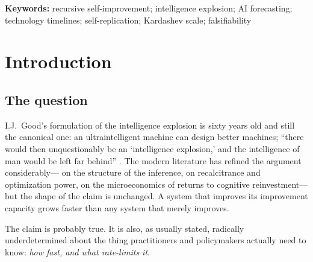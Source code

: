 \documentclass[11pt]{article}
\begin{document}
\begin{abstract}
Together these give the trajectory its characteristic shape: rapid apparent acceleration through the software loop, followed by a \emph{matter bottleneck} at the software/physical interface where growth is regulated not by cognition but by the slowest physical process on the critical path.

We present four-scenario timeline ranges rather than point estimates, give explicit falsification conditions for each structural claim, and identify a hazard in self-revising frameworks generally: a theory licensed to update its parameters on disconfirmation is unfalsifiable unless its revision rules are fixed in advance. We propose a pre-registration protocol as the remedy.
\end{abstract}

\vspace{0.5em}
\noindent\textbf{Keywords:} recursive self-improvement; intelligence explosion; AI forecasting; technology timelines; self-replication; Kardashev scale; falsifiability

\tableofcontents
\newpage

\section{Introduction}

\subsection{The question}

I.J.\ Good's formulation of the intelligence explosion is sixty years old and still the canonical one: an ultraintelligent machine can design better machines; ``there would then unquestionably be an `intelligence explosion,' and the intelligence of man would be left far behind'' \citep{good1965}. The modern literature has refined the argument considerably---\citet{chalmers2010} on the structure of the inference, \citet{bostrom2014} on recalcitrance and optimization power, \citet{yudkowsky2013} on the microeconomics of returns to cognitive reinvestment---but the shape of the claim is unchanged. A system that improves its improvement capacity grows faster than any system that merely improves.

The claim is probably true. It is also, as usually stated, radically underdetermined about the thing practitioners and policymakers actually need to know: \emph{how fast, and what rate-limits it}.
\end{document}
